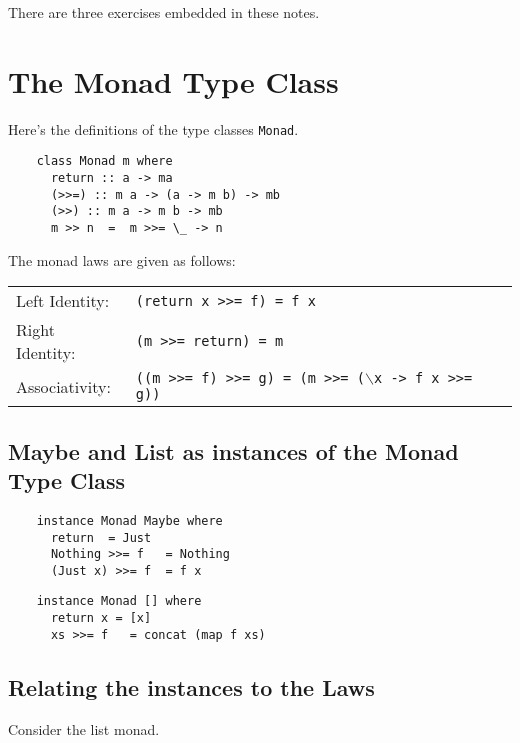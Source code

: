\documentclass[11pt]{article}
\begin{document}

There are three exercises embedded in these notes.


\section{The Monad Type Class}
Here's the definitions of the type classes {\tt{Monad}}.

\begin{verbatim}
    class Monad m where
      return :: a -> ma
      (>>=) :: m a -> (a -> m b) -> mb
      (>>) :: m a -> m b -> mb
      m >> n  =  m >>= \_ -> n
\end{verbatim}

\noindent{}The monad laws are given as follows:\\

\begin{tabular}{ll}
Left Identity: & {\tt{(return x >>= f) = f x}} \\
Right Identity: & {\tt{(m >>= return)  = m}} \\
Associativity: & {\tt{((m >>= f) >>= g) = (m >>= ($\backslash$x -> f x >>= g))}} \\
\end{tabular}

\subsection{Maybe and List as instances of the Monad Type Class}

\begin{verbatim}
    instance Monad Maybe where
      return  = Just
      Nothing >>= f   = Nothing
      (Just x) >>= f  = f x
\end{verbatim}

\begin{verbatim}
    instance Monad [] where
      return x = [x]
      xs >>= f   = concat (map f xs)
\end{verbatim}


\subsection{Relating the instances to the Laws}

Consider the list monad. 
\end{document}
